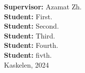 \begin{center}
\vspace{1.5cm}
\textbf{Supervisor:}\raggedleft \hspace{5cm} Azamat Zh.\\
\vspace{0.5cm}
\textbf{Student:}\raggedleft \hspace{5.7cm}  First.\\
\vspace{0.5cm}
\textbf{Student:}\raggedleft \hspace{5.4cm} Second.\\
\vspace{0.5cm}
\textbf{Student:}\raggedleft \hspace{5.2cm}  Third.\\
\vspace{0.5cm}
\textbf{Student:}\raggedleft \hspace{5.7cm} Fourth.\\
\vspace{0.5cm}
\textbf{Student:}\raggedleft \hspace{5.25cm}  fivth.\\




\vfill
Kaskelen, 2024\centering
\end{center}